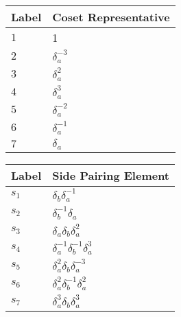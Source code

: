 \documentclass{article}
\begin{document}
\begin{center}
\begin{tabular}{ll}
\toprule
Label & Coset Representative\\
\midrule
$1$ & 1 \\
$2$ & $\delta_a^{-3}$ \\
$3$ & $\delta_a^{2}$ \\
$4$ & $\delta_a^{3}$ \\
$5$ & $\delta_a^{-2}$ \\
$6$ & $\delta_a^{-1}$ \\
$7$ & $\delta_a^{}$ \\
\bottomrule
\end{tabular}
\hfill
\begin{tabular}{ll}
\toprule
Label & Side Pairing Element\\
\midrule
$s_{1}$ & $\delta_b^{}\delta_a^{-1}$ \\
$s_{2}$ & $\delta_b^{-1}\delta_a^{}$ \\
$s_{3}$ & $\delta_a^{}\delta_b^{}\delta_a^{2}$ \\
$s_{4}$ & $\delta_a^{-1}\delta_b^{-1}\delta_a^{3}$ \\
$s_{5}$ & $\delta_a^{2}\delta_b^{}\delta_a^{-3}$ \\
$s_{6}$ & $\delta_a^{2}\delta_b^{-1}\delta_a^{2}$ \\
$s_{7}$ & $\delta_a^{3}\delta_b^{}\delta_a^{3}$ \\
\bottomrule
\end{tabular}
\end{center}

\thispagestyle{empty}
\end{document}
